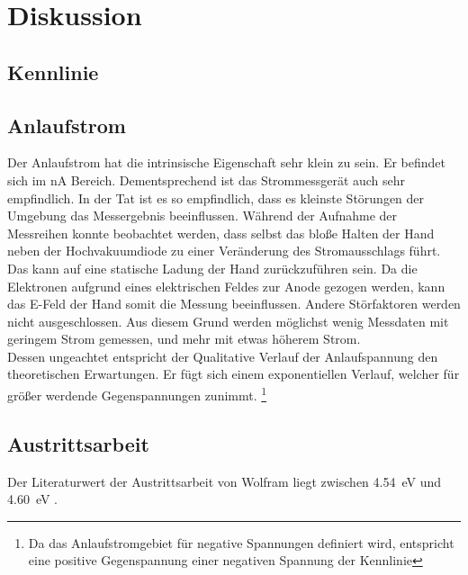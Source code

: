 


\section{Diskussion}
\label{sec:Diskussion}


 
\cite{Austrittsarbeit}

\subsection{Kennlinie}


\subsection{Anlaufstrom}

Der Anlaufstrom hat die intrinsische Eigenschaft sehr klein zu sein. Er befindet sich im \unit{\nano \ampere} Bereich. 
Dementsprechend ist das Strommessgerät auch sehr empfindlich. In der Tat ist es so empfindlich, dass es kleinste Störungen 
der Umgebung das Messergebnis beeinflussen. Während der Aufnahme der Messreihen konnte beobachtet werden, dass selbst das 
bloße Halten der Hand neben der Hochvakuumdiode zu einer Veränderung des Stromausschlags führt. Das kann auf eine statische 
Ladung der Hand zurückzuführen sein. Da die Elektronen aufgrund eines elektrischen Feldes zur Anode gezogen werden, kann das 
E-Feld der Hand somit die Messung beeinflussen. Andere Störfaktoren werden nicht ausgeschlossen. Aus diesem Grund werden 
möglichst wenig Messdaten mit geringem Strom gemessen, und mehr mit etwas höherem Strom. \\
\noindent Dessen ungeachtet entspricht der Qualitative Verlauf der Anlaufspannung den theoretischen Erwartungen. Er fügt sich 
einem exponentiellen Verlauf, welcher für größer werdende Gegenspannungen zunimmt. \footnote{Da das Anlaufstromgebiet für 
negative Spannungen definiert wird, entspricht eine positive Gegenspannung einer negativen Spannung der Kennlinie} 


\subsection{Austrittsarbeit}

Der Literaturwert der Austrittsarbeit von Wolfram liegt zwischen \qty{4.54}{\electronvolt} und \qty{4.60}{\electronvolt} 
\cite{Austrittsarbeit}.






